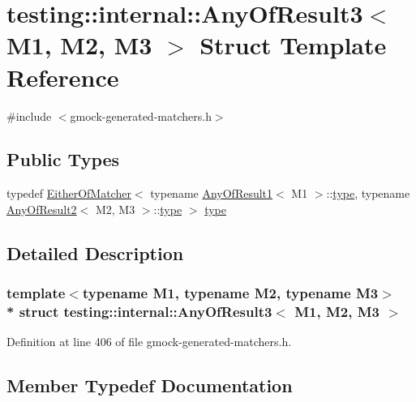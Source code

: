 \hypertarget{structtesting_1_1internal_1_1_any_of_result3}{}\section{testing\+:\+:internal\+:\+:Any\+Of\+Result3$<$ M1, M2, M3 $>$ Struct Template Reference}
\label{structtesting_1_1internal_1_1_any_of_result3}


{\ttfamily \#include $<$gmock-\/generated-\/matchers.\+h$>$}

\subsection*{Public Types}
\begin{DoxyCompactItemize}
\item 
typedef \hyperlink{classtesting_1_1internal_1_1_either_of_matcher}{Either\+Of\+Matcher}$<$ typename \hyperlink{structtesting_1_1internal_1_1_any_of_result1}{Any\+Of\+Result1}$<$ M1 $>$\+::\hyperlink{structtesting_1_1internal_1_1_any_of_result3_a232b20553cc0a33a6741e85e19ef4b0c}{type}, typename \hyperlink{structtesting_1_1internal_1_1_any_of_result2}{Any\+Of\+Result2}$<$ M2, M3 $>$\+::\hyperlink{structtesting_1_1internal_1_1_any_of_result3_a232b20553cc0a33a6741e85e19ef4b0c}{type} $>$ \hyperlink{structtesting_1_1internal_1_1_any_of_result3_a232b20553cc0a33a6741e85e19ef4b0c}{type}
\end{DoxyCompactItemize}


\subsection{Detailed Description}
\subsubsection*{template$<$typename M1, typename M2, typename M3$>$\\*
struct testing\+::internal\+::\+Any\+Of\+Result3$<$ M1, M2, M3 $>$}



Definition at line 406 of file gmock-\/generated-\/matchers.\+h.



\subsection{Member Typedef Documentation}
